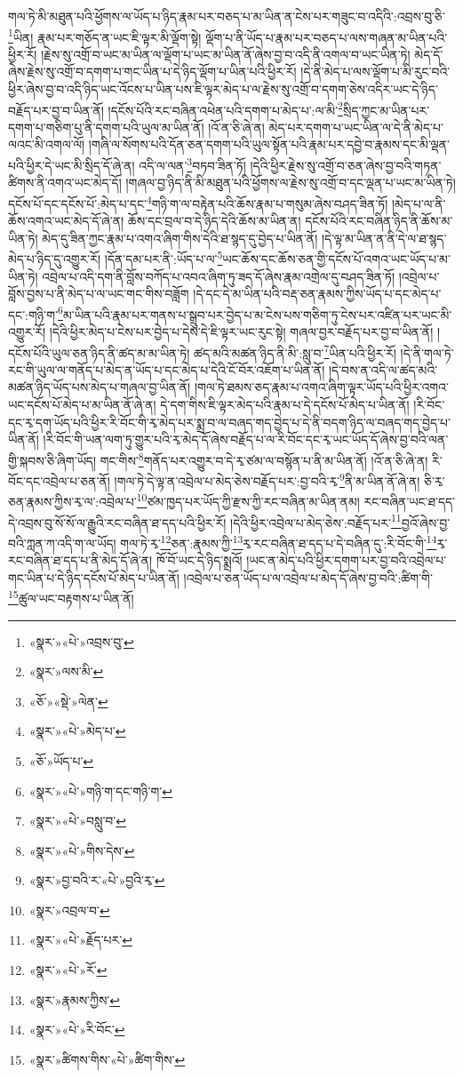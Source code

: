 གལ་ཏེ་མི་མཐུན་པའི་ཕྱོགས་ལ་ཡོད་པ་ཉིད་རྣམ་པར་བཅད་པ་མ་ཡིན་ན་ངེས་པར་གཟུང་བ་འདིའི་:འབྲས་བུ་ཅི་\footnote{«སྣར་»«པེ་»འབྲས་བུ་}ཡིན། རྣམ་པར་གཅོད་ན་ཡང་ཇི་ལྟར་མི་ལྡོག་སྟེ། ལྡོག་པ་ནི་ཡོད་པ་རྣམ་པར་བཅད་པ་ལས་གཞན་མ་ཡིན་པའི་ཕྱིར་རོ། །རྗེས་སུ་འགྲོ་བ་ཡང་མ་ཡིན་ལ་ལྡོག་པ་ཡང་མ་ཡིན་ནོ་ཞེས་བྱ་བ་འདི་ནི་འགལ་བ་ཡང་ཡིན་ཏེ། མེད་དོ་ཞེས་རྗེས་སུ་འགྲོ་བ་དགག་པ་གང་ཡིན་པ་དེ་ཉིད་ལྡོག་པ་ཡིན་པའི་ཕྱིར་རོ། །དེ་ནི་མེད་པ་ལས་ལྡོག་པ་མི་རུང་བའི་ཕྱིར་ཞེས་བྱ་བ་འདི་ཉིད་ཡང་འོངས་པ་ཡིན་པས་ཇི་ལྟར་མེད་པ་ལ་རྗེས་སུ་འགྲོ་བ་དགག་ཅེས་འདིར་ཡང་དེ་ཉིད་བརྗོད་པར་བྱ་བ་ཡིན་ནོ། །དངོས་པོའི་རང་བཞིན་འཕེན་པའི་དགག་པ་མེད་པ་:ལ་མི་\footnote{«སྣར་»ལས་མི་}སྲིད་ཀྱང་མ་ཡིན་པར་དགག་པ་གཅིག་པུ་ནི་དགག་པའི་ཡུལ་མ་ཡིན་ནོ། །འོ་ན་ཅི་ཞེ་ན། མེད་པར་དགག་པ་ཡང་ཡིན་ལ་དེ་ནི་མེད་པ་ལའང་མི་འགལ་ལོ། །གཞི་ལ་སོགས་པའི་དོན་ཅན་དགག་པའི་ཡུལ་སྟོན་པའི་རྣམ་པར་དབྱེ་བ་རྣམས་དང་མི་ལྡན་པའི་ཕྱིར་དེ་ཡང་མི་སྲིད་དོ་ཞེ་ན། འདི་ལ་ལན་\footnote{«ཅོ་»«སྡེ་»ལེན་}བཏབ་ཟིན་ཏོ། །དེའི་ཕྱིར་རྗེས་སུ་འགྲོ་བ་ཅན་ཞེས་བྱ་བའི་གཏན་ཚིགས་ནི་འགའ་ཡང་མེད་དོ། །གཞལ་བྱ་ཉིད་ནི་མི་མཐུན་པའི་ཕྱོགས་ལ་རྗེས་སུ་འགྲོ་བ་དང་ལྡན་པ་ཡང་མ་ཡིན་ཏེ། དངོས་པོ་དང་དངོས་པོ་:མེད་པ་དང་\footnote{«སྣར་»«པེ་»མེད་པ་}གཉི་ག་ལ་བརྟེན་པའི་ཆོས་རྣམ་པ་གསུམ་ཞེས་བཤད་ཟིན་ཏོ། །མེད་པ་ལ་ནི་ཆོས་འགའ་ཡང་མེད་དོ་ཞེ་ན། ཆོས་དང་བྲལ་བ་དེ་ཉིད་དེའི་ཆོས་མ་ཡིན་ན། དངོས་པོའི་རང་བཞིན་ཉིད་ནི་ཆོས་མ་ཡིན་ཏེ། མེད་དུ་ཟིན་ཀྱང་རྣམ་པ་འགའ་ཞིག་གིས་དེའི་ཐ་སྙད་དུ་བྱེད་པ་ཡིན་ནོ། །དེ་ལྟ་མ་ཡིན་ན་ནི་དེ་ལ་ཐ་སྙད་མེད་པ་ཉིད་དུ་འགྱུར་རོ། །དོན་དམ་པར་ནི་:ཡོད་པ་ལ་\footnote{«ཅོ་»ཡོད་པ་}ཡང་ཆོས་དང་ཆོས་ཅན་གྱི་དངོས་པོ་འགའ་ཡང་ཡོད་པ་མ་ཡིན་ཏེ། འབྲེལ་པ་འདི་དག་ནི་བློས་བཀོད་པ་འབའ་ཞིག་ཏུ་ཟད་དོ་ཞེས་རྣམ་འགྲེལ་དུ་བཤད་ཟིན་ཏོ། །འབྲེལ་པ་བློས་བྱས་པ་ནི་མེད་པ་ལ་ཡང་གང་གིས་བཟློག །དེ་དང་དེ་མ་ཡིན་པའི་བརྡ་ཅན་རྣམས་ཀྱིས་ཡོད་པ་དང་མེད་པ་དང་:གཉི་ག་\footnote{«སྣར་»«པེ་»གཉི་ག་དང་གཉི་ག་}མ་ཡིན་པའི་རྣམ་པར་གནས་པ་སྒྲུབ་པར་བྱེད་པ་མ་ངེས་པས་གཅིག་ཏུ་ངེས་པར་འཛིན་པར་ཡང་མི་འགྱུར་རོ། །དེའི་ཕྱིར་མེད་པ་ངེས་པར་བྱེད་པ་དེས་དེ་ཇི་ལྟར་ཡང་རུང་སྟེ། གཞལ་བྱར་བརྗོད་པར་བྱ་བ་ཡིན་ནོ། །དངོས་པོའི་ཡུལ་ཅན་ཉིད་ནི་ཚད་མ་མ་ཡིན་ཏེ། ཚད་མའི་མཚན་ཉིད་ནི་མི་:སླུ་བ་\footnote{«སྣར་»«པེ་»བསླུ་བ་}ཡིན་པའི་ཕྱིར་རོ། །དེ་ནི་གལ་ཏེ་རང་གི་ཡུལ་ལ་གནོད་པ་མེད་ན་ཡོད་པ་དང་མེད་པ་དེའི་ངོ་བོར་འཇོག་པ་ཡིན་ནོ། །དེ་བས་ན་འདི་ལ་ཚད་མའི་མཚན་ཉིད་ཡོད་པས་མེད་པ་གཞལ་བྱ་ཡིན་ནོ། །གལ་ཏེ་ཐམས་ཅད་རྣམ་པ་འགའ་ཞིག་ལྟར་ཡོད་པའི་ཕྱིར་འགའ་ཡང་དངོས་པོ་མེད་པ་མ་ཡིན་ནོ་ཞེ་ན། དེ་དག་གིས་ཇི་ལྟར་མེད་པའི་རྣམ་པ་དེ་དངོས་པོ་མེད་པ་ཡིན་ནོ། །རི་བོང་དང་རྭ་དག་ཡོད་པའི་ཕྱིར་རི་བོང་གི་རྭ་མེད་པར་སྨྲ་བ་ལ་བཞད་གད་བྱེད་པ་དེ་ནི་བདག་ཉིད་ལ་བཞད་གད་བྱེད་པ་ཡིན་ནོ། །རི་བོང་གི་ཡན་ལག་ཏུ་གྱུར་པའི་རྭ་མེད་དོ་ཞེས་བརྗོད་པ་ལ་རི་བོང་དང་རྭ་ཡང་ཡོད་དོ་ཞེས་བྱ་བའི་ལན་གྱི་སྐབས་ཅི་ཞིག་ཡོད། གང་གིས་\footnote{«སྣར་»«པེ་»གིས་དེས་}གནོད་པར་འགྱུར་བ་དེ་རྭ་ཙམ་ལ་བསྙོན་པ་ནི་མ་ཡིན་ནོ། །འོ་ན་ཅི་ཞེ་ན། རི་བོང་དང་འབྲེལ་པ་ཅན་ནོ། །གལ་ཏེ་དེ་ལྟ་ན་འབྲེལ་པ་མེད་ཅེས་བརྗོད་པར་:བྱ་བའི་རྭ་\footnote{«སྣར་»བྱ་བའི་ར་«པེ་»བྱའི་རྭ་}ནི་མ་ཡིན་ནོ་ཞེ་ན། ཅི་རྭ་ཅན་རྣམས་ཀྱིས་རྭ་ལ་:འབྲེལ་པ་\footnote{«སྣར་»འབྲལ་བ་}ཙམ་ཁྱད་པར་ཡོད་ཀྱི་རྫས་ཀྱི་རང་བཞིན་མ་ཡིན་ནམ། རང་བཞིན་ཡང་ཐ་དད་དེ་འབྲས་བུ་སོ་སོ་ལ་རྒྱུའི་རང་བཞིན་ཐ་དད་པའི་ཕྱིར་རོ། །དེའི་ཕྱིར་འབྲེལ་པ་མེད་ཅེས་:བརྗོད་པར་\footnote{«སྣར་»«པེ་»རྗོད་པར་}བྱའོ་ཞེས་བྱ་བའི་ཀླན་ཀ་འདི་ག་ལ་ཡོད། གལ་ཏེ་རྭ་\footnote{«སྣར་»«པེ་»རོ་}ཅན་:རྣམས་ཀྱི་\footnote{«སྣར་»རྣམས་ཀྱིས་}རྭ་རང་བཞིན་ཐ་དད་པ་དེ་བཞིན་དུ་:རི་བོང་གི་\footnote{«སྣར་»«པེ་»རི་བོང་}རྭ་རང་བཞིན་ཐ་དད་པ་ནི་མེད་དོ་ཞེ་ན། ཁོ་བོ་ཡང་དེ་ཉིད་སྨྲའོ། །ཡང་ན་མེད་པའི་ཕྱིར་དགག་པར་བྱ་བའི་འབྲེལ་པ་གང་ཡིན་པ་དེ་ཉིད་དངོས་པོ་མེད་པ་ཡིན་ནོ། །འབྲེལ་པ་ཅན་ཡོད་པ་ལ་འབྲེལ་པ་མེད་དོ་ཞེས་བྱ་བའི་:ཚིག་གི་\footnote{«སྣར་»ཚིགས་གིས་«པེ་»ཚིག་གིས་}ཚུལ་ཡང་བརྟགས་པ་ཡིན་ནོ། 